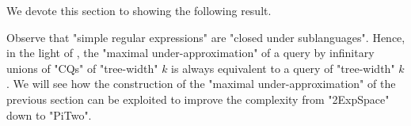 We devote this section to showing the following result.

\thmSemTwSREpitwo 

Observe that "simple regular expressions" are "closed under sublanguages". Hence, in the light of
, the "maximal under-approximation" of a {\UCRPQSRE} query by infinitary unions of "CQs" of "tree-width" $k$ is always equivalent to a {\UCRPQSRE} query  of "tree-width" $k$. We will see how the construction of the "maximal under-approximation" of the previous section can be exploited to improve the complexity from "2ExpSpace" down to "PiTwo".


